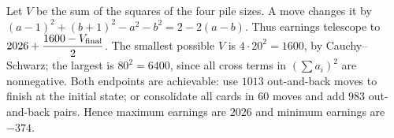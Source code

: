 Let $V$ be the sum of the squares of the four pile sizes. A move changes it by $(a-1)^2+(b+1)^2-a^2-b^2=2-2(a-b)$. Thus earnings telescope to $2026+\dfrac{1600-V_{\rm final}}{2}$. The smallest possible $V$ is $4\cdot20^2=1600$, by Cauchy--Schwarz; the largest is $80^2=6400$, since all cross terms in $(\sum a_i)^2$ are nonnegative. Both endpoints are achievable: use $1013$ out-and-back moves to finish at the initial state; or consolidate all cards in $60$ moves and add $983$ out-and-back pairs. Hence maximum earnings are $\boxed{2026}$ and minimum earnings are $\boxed{-374}$.
